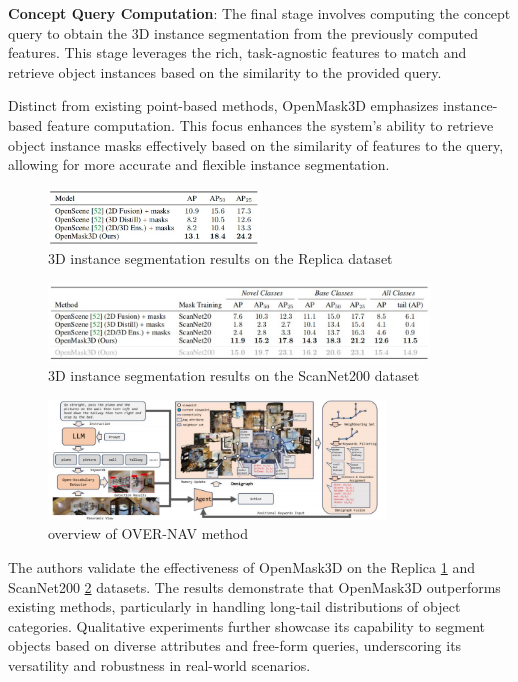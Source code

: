\textbf{Concept Query Computation}: The final stage involves computing the concept query to obtain the 3D instance segmentation from the previously computed features. This stage leverages the rich, task-agnostic features to match and retrieve object instances based on the similarity to the provided query.


Distinct from existing point-based methods, OpenMask3D emphasizes instance-based feature computation. This focus enhances the system's ability to retrieve object instance masks effectively based on the similarity of features to the query, allowing for more accurate and flexible instance segmentation.

\begin{figure}[h]
    \centering
    \includegraphics[width=0.5\textwidth]{img/result2_1.jpg}
    \caption{3D instance segmentation results on the Replica dataset}
    \label{fig:Replica}
\end{figure}

\begin{figure}[h]
    \centering
    \includegraphics[width=0.9\textwidth]{img/result2_2.jpg}
    \caption{3D instance segmentation results on the ScanNet200 dataset}
    \label{fig:ScanNet}
\end{figure}

\begin{figure}[h]
  \centering
  \includegraphics[width=0.8\textwidth]{img/over.png}
  \caption{overview of OVER-NAV method}
\end{figure}


The authors validate the effectiveness of OpenMask3D on the Replica \ref{fig:Replica} and ScanNet200 \ref{fig:ScanNet} datasets. The results demonstrate that OpenMask3D outperforms existing methods, particularly in handling long-tail distributions of object categories. Qualitative experiments further showcase its capability to segment objects based on diverse attributes and free-form queries, underscoring its versatility and robustness in real-world scenarios.


